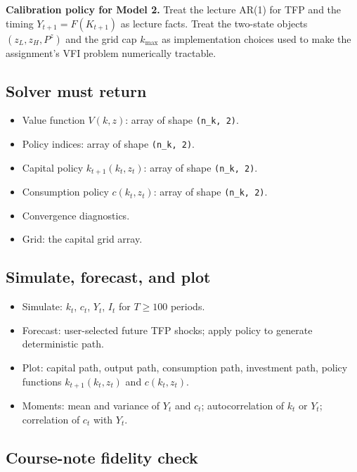 \documentclass[11pt]{article}
\begin{document}
\begin{notebox}
\textbf{Calibration policy for Model 2.} Treat the lecture AR(1) for TFP and the timing $Y_{t+1}=F(K_{t+1})$ as lecture facts. Treat the two-state objects $(z_L,z_H,P^z)$ and the grid cap $k_{\max}$ as implementation choices used to make the assignment's VFI problem numerically tractable.
\end{notebox}

\subsection{Solver must return}
\begin{itemize}
    \item Value function $V(k,z)$: array of shape \texttt{(n\_k, 2)}.
    \item Policy indices: array of shape \texttt{(n\_k, 2)}.
    \item Capital policy $k_{t+1}(k_t,z_t)$: array of shape \texttt{(n\_k, 2)}.
    \item Consumption policy $c(k_t,z_t)$: array of shape \texttt{(n\_k, 2)}.
    \item Convergence diagnostics.
    \item Grid: the capital grid array.
\end{itemize}

\subsection{Simulate, forecast, and plot}
\begin{itemize}
    \item Simulate: $k_t$, $c_t$, $Y_t$, $I_t$ for $T \geq 100$ periods.
    \item Forecast: user-selected future TFP shocks; apply policy to generate deterministic path.
    \item Plot: capital path, output path, consumption path, investment path, policy functions $k_{t+1}(k_t,z_t)$ and $c(k_t,z_t)$.
    \item Moments: mean and variance of $Y_t$ and $c_t$; autocorrelation of $k_t$ or $Y_t$; correlation of $c_t$ with $Y_t$.
\end{itemize}

\subsection{Course-note fidelity check}
\end{document}
